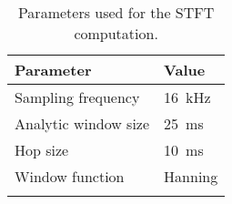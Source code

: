 \begin{table}[ht!]
\small
\begin{center}
\caption{Parameters used for the STFT computation.}
\begin{tabular}{ M{4cm}  M{4cm}}
\toprule
\textbf{Parameter} & \textbf{Value} \\
\midrule
Sampling frequency & \SI{16}{\kilo\hertz}\\
Analytic window size & \SI{25}{\milli\second}\\
Hop size & \SI{10}{\milli\second}\\
Window function & Hanning\\
\bottomrule
\label{tab:signal_spec_stft}
\end{tabular}
\end{center}
\vspace{-4mm}
\end{table}
\FloatBarrier
\noindent